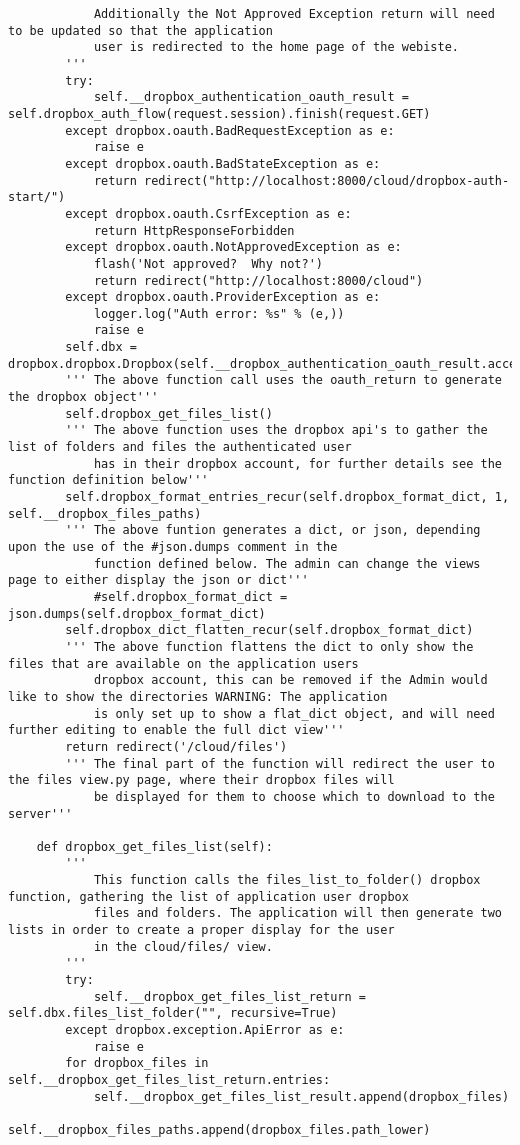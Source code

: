 \documentclass{article}
\begin{document}
\begin{verbatim}
            Additionally the Not Approved Exception return will need to be updated so that the application
            user is redirected to the home page of the webiste.
        '''
        try:
            self.__dropbox_authentication_oauth_result = self.dropbox_auth_flow(request.session).finish(request.GET)
        except dropbox.oauth.BadRequestException as e:
            raise e
        except dropbox.oauth.BadStateException as e:
            return redirect("http://localhost:8000/cloud/dropbox-auth-start/")
        except dropbox.oauth.CsrfException as e:
            return HttpResponseForbidden
        except dropbox.oauth.NotApprovedException as e:
            flash('Not approved?  Why not?')
            return redirect("http://localhost:8000/cloud")
        except dropbox.oauth.ProviderException as e:
            logger.log("Auth error: %s" % (e,))
            raise e
        self.dbx = dropbox.dropbox.Dropbox(self.__dropbox_authentication_oauth_result.access_token)
        ''' The above function call uses the oauth_return to generate the dropbox object'''
        self.dropbox_get_files_list()
        ''' The above function uses the dropbox api's to gather the list of folders and files the authenticated user
            has in their dropbox account, for further details see the function definition below'''
        self.dropbox_format_entries_recur(self.dropbox_format_dict, 1, self.__dropbox_files_paths)
        ''' The above funtion generates a dict, or json, depending upon the use of the #json.dumps comment in the 
            function defined below. The admin can change the views page to either display the json or dict'''
            #self.dropbox_format_dict = json.dumps(self.dropbox_format_dict)
        self.dropbox_dict_flatten_recur(self.dropbox_format_dict)
        ''' The above function flattens the dict to only show the files that are available on the application users 
            dropbox account, this can be removed if the Admin would like to show the directories WARNING: The application
            is only set up to show a flat_dict object, and will need further editing to enable the full dict view'''
        return redirect('/cloud/files') 
        ''' The final part of the function will redirect the user to the files view.py page, where their dropbox files will
            be displayed for them to choose which to download to the server'''

    def dropbox_get_files_list(self):
        '''
            This function calls the files_list_to_folder() dropbox function, gathering the list of application user dropbox
            files and folders. The application will then generate two lists in order to create a proper display for the user
            in the cloud/files/ view.
        '''
        try:
            self.__dropbox_get_files_list_return = self.dbx.files_list_folder("", recursive=True)
        except dropbox.exception.ApiError as e:
            raise e
        for dropbox_files in self.__dropbox_get_files_list_return.entries:
            self.__dropbox_get_files_list_result.append(dropbox_files)
            self.__dropbox_files_paths.append(dropbox_files.path_lower)         
    

\end{verbatim}
\end{document}
